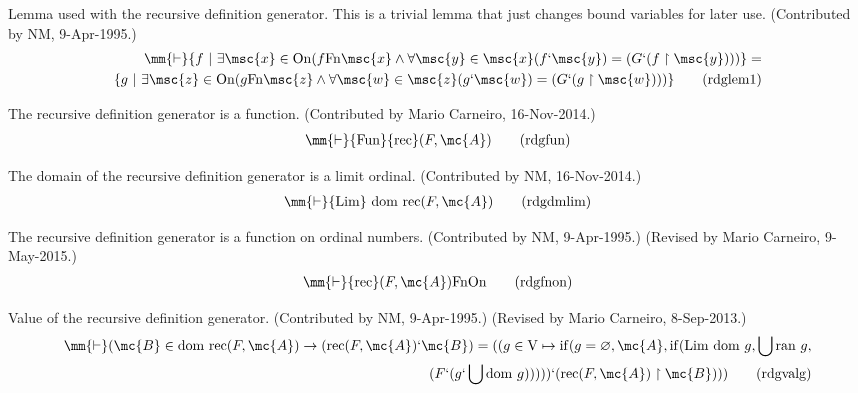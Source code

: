 \begin{lemma} Lemma used with the recursive definition
generator.  This is a trivial
       lemma that just changes bound variables for later use.  (Contributed by
       NM, 9-Apr-1995.)
\begin{align}
\mm{\vdash} \{ f ~\vert~ \exists \msc{x} \in {\rm On} ( f {\rm Fn} \msc{x}
    \wedge \forall \msc{y} \in \msc{x} ( f ` \msc{y} ) = 
    ( G ` ( f \restriction
    \msc{y} ) ) ) \} = \\
     \{ g ~\vert~ \exists \msc{z} \in {\rm On} ( g {\rm Fn}
    \msc{z} \wedge \forall \msc{w} \in \msc{z} ( g ` \msc{w} ) = ( G ` ( g
    \restriction \msc{w} ) ) ) \}\label{eq:rdglem1}\tag{rdglem1}
\end{align}
\end{lemma}


\begin{lemma} The recursive definition generator is a
function.  (Contributed by Mario
       Carneiro, 16-Nov-2014.)
\begin{align}
\mm{\vdash} {\rm Fun} {\rm rec} ( F , \mc{A} )\label{eq:rdgfun}\tag{rdgfun}
\end{align}
\end{lemma}


\begin{lemma} The domain of the recursive definition
generator is a limit ordinal.
       (Contributed by NM, 16-Nov-2014.)
\begin{align}
\mm{\vdash} {\rm Lim}~ {\rm dom}~ {\rm rec} ( F , \mc{A}
    )\label{eq:rdgdmlim}\tag{rdgdmlim}
\end{align}
\end{lemma}


\begin{lemma} The recursive definition generator is a
function on ordinal numbers.
       (Contributed by NM, 9-Apr-1995.)  (Revised by Mario Carneiro,
       9-May-2015.)
\begin{align}
\mm{\vdash} {\rm rec} ( F , \mc{A} ) {\rm Fn} {\rm
    On}\label{eq:rdgfnon}\tag{rdgfnon}
\end{align}
\end{lemma}


\begin{lemma} Value of the recursive definition
generator.  (Contributed by NM,
       9-Apr-1995.)  (Revised by Mario Carneiro, 8-Sep-2013.)
\begin{align}
\mm{\vdash} ( \mc{B} \in {\rm dom}~ {\rm rec} ( F , \mc{A} ) \rightarrow ( {\rm
    rec} ( F , \mc{A} ) ` \mc{B} ) = ( ( g \in {\rm V} \mapsto {\rm if} ( g =
    \varnothing , \mc{A} , {\rm if} ( {\rm Lim}~ {\rm dom}~ g , \bigcup {\rm ran}~
    g , \\
     ( F ` ( g ` \bigcup {\rm dom}~ g ) ) ) ) ) ` ( {\rm rec} ( F , \mc{A} )
    \restriction \mc{B} ) ) )\label{eq:rdgvalg}\tag{rdgvalg}
\end{align}
\end{lemma}


